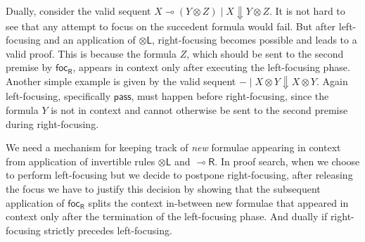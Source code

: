 \documentclass[runningheads]{llncs}
\newcommand{\tl}{\otimes \mathsf{L}}
\newcommand{\lright}{{\multimap}\mathsf{R}}
\newcommand{\pass}{\mathsf{pass}}
\newcommand{\otL}{\tl}
\newcommand{\lolliR}{\lright}
\newcommand{\ot}{\otimes}
\newcommand{\lolli}{\multimap}
\newcommand{\dn}{\Downarrow}
\newcommand{\focR}{\mathsf{foc_R}}
\begin{document}
Dually, consider the valid sequent $X \lolli (Y \ot Z) \mid X \dn Y \ot Z$. It is not hard to see that any attempt to focus on the succedent formula would fail. But after left-focusing and an application of $\otL$, right-focusing becomes possible and leads to a valid proof. This is because the formula $Z$, which should be sent to the second premise by $\focR$, appears in context only after executing the left-focusing phase. Another simple example is given by the valid sequent $- \mid X \ot Y \dn X \ot Y$. Again left-focusing, specifically $\pass$, must happen before right-focusing, since the formula $Y$ is not in context and cannot otherwise be sent to the second premise during right-focusing.

We need a mechanism for keeping track of \emph{new} formulae appearing in context from application of invertible rules $\otL$ and $\lolliR$. In proof search, when we choose to perform left-focusing but we decide to postpone right-focusing, after releasing the focus we have to justify this decision by showing that the subsequent application of $\focR$ splits the context in-between new formulae that appeared in context only after the termination of the left-focusing phase. And dually if right-focusing strictly precedes left-focusing.
\end{document}
